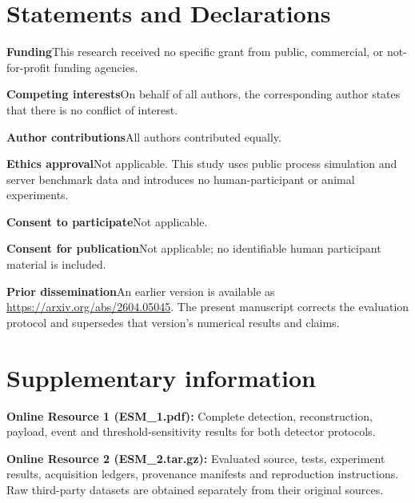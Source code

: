 \documentclass[pdflatex,sn-vancouver-num]{sn-jnl}
\theoremstyle{thmstyleone}
\begin{document}
\section*{Statements and Declarations}
\par\medskip\noindent\textbf{Funding}\enspace This research received no specific grant from public,
commercial, or not-for-profit funding agencies.
\par\medskip\noindent\textbf{Competing interests}\enspace On behalf of all authors, the corresponding
author states that there is no conflict of interest.
\par\medskip\noindent\textbf{Author contributions}\enspace All authors contributed equally.
\par\medskip\noindent\textbf{Ethics approval}\enspace Not applicable. This study uses public process
simulation and server benchmark data and introduces no human-participant or
animal experiments.
\par\medskip\noindent\textbf{Consent to participate}\enspace Not applicable.
\par\medskip\noindent\textbf{Consent for publication}\enspace Not applicable; no identifiable human
participant material is included.
\par\medskip\noindent\textbf{Prior dissemination}\enspace An earlier version is available as
\url{https://arxiv.org/abs/2604.05045}. The present manuscript corrects the
evaluation protocol and supersedes that version's numerical results and claims.

\section*{Supplementary information}
\textbf{Online Resource 1 (ESM\_1.pdf):} Complete detection, reconstruction,
payload, event and threshold-sensitivity results for both detector protocols.

\textbf{Online Resource 2 (ESM\_2.tar.gz):} Evaluated source, tests, experiment
results, acquisition ledgers, provenance manifests and reproduction instructions.
Raw third-party datasets are obtained separately from their original sources.


\end{document}
